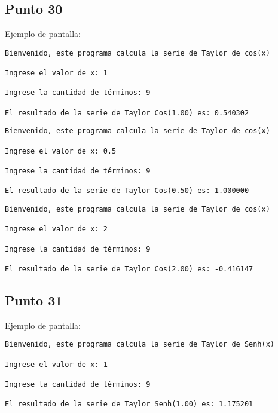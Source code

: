 



\subsection{Punto 30}
	
	Ejemplo de pantalla:
\begin{lstlisting}
Bienvenido, este programa calcula la serie de Taylor de cos(x)

Ingrese el valor de x: 1

Ingrese la cantidad de términos: 9

El resultado de la serie de Taylor Cos(1.00) es: 0.540302
\end{lstlisting}

\begin{lstlisting}
Bienvenido, este programa calcula la serie de Taylor de cos(x)

Ingrese el valor de x: 0.5

Ingrese la cantidad de términos: 9

El resultado de la serie de Taylor Cos(0.50) es: 1.000000
\end{lstlisting}

\begin{lstlisting}
Bienvenido, este programa calcula la serie de Taylor de cos(x)

Ingrese el valor de x: 2

Ingrese la cantidad de términos: 9

El resultado de la serie de Taylor Cos(2.00) es: -0.416147
\end{lstlisting}





\subsection{Punto 31}
	
	Ejemplo de pantalla:
\begin{lstlisting}
Bienvenido, este programa calcula la serie de Taylor de Senh(x)

Ingrese el valor de x: 1

Ingrese la cantidad de términos: 9

El resultado de la serie de Taylor Senh(1.00) es: 1.175201
\end{lstlisting}

